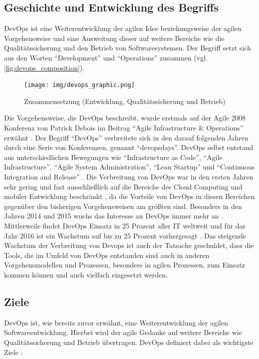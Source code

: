 \subsection{Geschichte und Entwicklung des Begriffs}
DevOps ist eine Weiterentwicklung der agilen Idee beziehungsweise der agilen Vorgehensweise und eine Ausweitung dieser auf weitere Bereiche wie die Qualitätssicherung und den Betrieb von Softwaresystemen. 
Der Begriff setzt sich aus den Worten \enquote{Development} und \enquote{Operations}  zusammen (vgl. \autoref{fig:devops_composition}).

\begin{figure}[ht]
  \centering
  \texttt{[image: img/devops\_graphic.png]}
  \caption{Zusammensetzung (Entwicklung, Qualitätssicherung und Betrieb)}
  \label{fig:devops_composition}
\end{figure}

Die Vorgehensweise, die DevOps beschreibt, wurde erstmals auf der Agile 2008 Konferenz von Patrick Debois im Beitrag \enquote{Agile Infrastructure \& Operations} erwähnt \parencite[vgl.][]{Debois:2008}.
Der Begriff \enquote{DevOps} verbreitete sich in den darauf folgenden Jahren durch eine Serie von Konferenzen, genannt \enquote{devopsdays}.
DevOps selbst entstand aus unterschiedlichen Bewegungen wie \enquote{Infrastructure as Code}, \enquote{Agile Infrastructure}, \enquote{Agile System Administration}, \enquote{Lean Startup} und \enquote{Continuous Integration and Release} \parencite[vgl.][S. 4]{Kim:2015}.
Die Verbreitung von DevOps war in den ersten Jahren sehr gering und fast ausschließlich auf die Bereiche des Cloud Computing und mobiler Entwicklung beschränkt \parencite[vgl.][]{Gartner:2015}, da die Vorteile von DevOps in diesen Bereichen gegenüber den bisherigen Vorgehensweisen am größten sind. 
Besonders in den Jahren 2014 und 2015 wuchs das Interesse an DevOps immer mehr an \parencite[vgl.][S. 7]{DevOpsSODR:2015}.
 Mittlerweile findet DevOps Einsatz in 25 Prozent aller IT weltweit und für das Jahr 2016 ist ein Wachstum auf bis zu 25 Prozent vorhergesagt \parencite[vgl.][]{Gartner:2015}. 
 Das steigende Wachstum der Verbreitung von Devops ist auch der Tatsache geschuldet, dass die Tools, die im Umfeld von DevOps entstanden sind auch in anderen Vorgehensmodellen und Prozessen, besonders in agilen Prozessen, zum Einsatz kommen können und auch vielfach eingesetzt werden.

\subsection{Ziele}
DevOps ist, wie bereits zuvor erwähnt, eine Weiterentwicklung der agilen Softwareentwicklung. 
Hierbei wird der agile Gedanke auf weitere Bereiche wie Qualitätssicherung und Betrieb übertragen. 
DevOps definiert dabei als wichtigste Ziele \parencite[vgl.][S. 4]{Kim:2015}:

